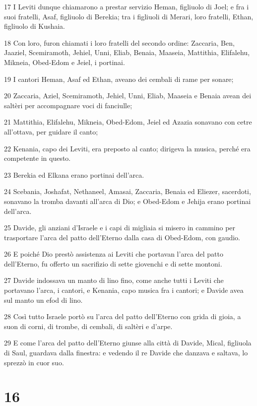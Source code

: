 \par 17 I Leviti dunque chiamarono a prestar servizio Heman, figliuolo di Joel; e fra i suoi fratelli, Asaf, figliuolo di Berekia; tra i figliuoli di Merari, loro fratelli, Ethan, figliuolo di Kushaia.
\par 18 Con loro, furon chiamati i loro fratelli del secondo ordine: Zaccaria, Ben, Jaaziel, Scemiramoth, Jehiel, Unni, Eliab, Benaia, Maaseia, Mattithia, Elifalehu, Mikneia, Obed-Edom e Jeiel, i portinai.
\par 19 I cantori Heman, Asaf ed Ethan, aveano dei cembali di rame per sonare;
\par 20 Zaccaria, Aziel, Scemiramoth, Jehiel, Unni, Eliab, Maaseia e Benaia avean dei saltèri per accompagnare voci di fanciulle;
\par 21 Mattithia, Elifalehu, Mikneia, Obed-Edom, Jeiel ed Azazia sonavano con cetre all'ottava, per guidare il canto;
\par 22 Kenania, capo dei Leviti, era preposto al canto; dirigeva la musica, perché era competente in questo.
\par 23 Berekia ed Elkana erano portinai dell'arca.
\par 24 Scebania, Joshafat, Nethaneel, Amasai, Zaccaria, Benaia ed Eliezer, sacerdoti, sonavano la tromba davanti all'arca di Dio; e Obed-Edom e Jehija erano portinai dell'arca.
\par 25 Davide, gli anziani d'Israele e i capi di migliaia si misero in cammino per trasportare l'arca del patto dell'Eterno dalla casa di Obed-Edom, con gaudio.
\par 26 E poiché Dio prestò assistenza ai Leviti che portavan l'arca del patto dell'Eterno, fu offerto un sacrifizio di sette giovenchi e di sette montoni.
\par 27 Davide indossava un manto di lino fino, come anche tutti i Leviti che portavano l'arca, i cantori, e Kenania, capo musica fra i cantori; e Davide avea sul manto un efod di lino.
\par 28 Così tutto Israele portò su l'arca del patto dell'Eterno con grida di gioia, a suon di corni, di trombe, di cembali, di saltèri e d'arpe.
\par 29 E come l'arca del patto dell'Eterno giunse alla città di Davide, Mical, figliuola di Saul, guardava dalla finestra: e vedendo il re Davide che danzava e saltava, lo sprezzò in cuor suo.

\chapter{16}

